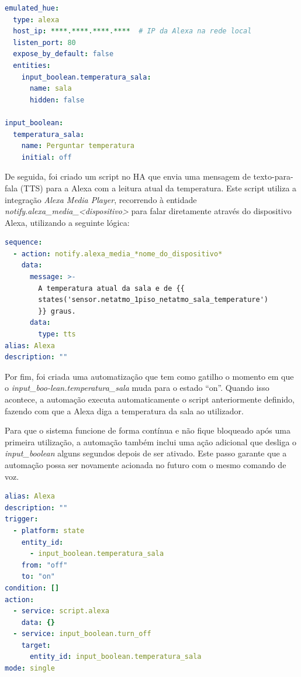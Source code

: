 \newpage

\lstset{inputencoding=ascii}
\begin{lstlisting}[language=YAML, caption={configuration.yaml}]
emulated_hue:
  type: alexa
  host_ip: ****.****.****.****  # IP da Alexa na rede local
  listen_port: 80
  expose_by_default: false
  entities:
    input_boolean.temperatura_sala:
      name: sala
      hidden: false

input_boolean:
  temperatura_sala:
    name: Perguntar temperatura
    initial: off
\end{lstlisting}

De seguida, foi criado um script no \gls{HA} que envia uma mensagem de texto-para-fala (TTS) para a Alexa com a leitura atual da temperatura. Este script utiliza a integração \textit{Alexa Media Player}, recorrendo à entidade \textit{notify.alexa\_media\_<dispositivo>} para falar diretamente através do dispositivo Alexa, utilizando a seguinte lógica:

\lstset{inputencoding=ascii}
\begin{lstlisting}[language=YAML, caption={configuration.yaml}]
sequence:
  - action: notify.alexa_media_*nome_do_dispositivo*
    data:
      message: >-
        A temperatura atual da sala e de {{
        states('sensor.netatmo_1piso_netatmo_sala_temperature') 
        }} graus.
      data:
        type: tts
alias: Alexa
description: ""
\end{lstlisting}

\vspace{-180pt}

\newpage

Por fim, foi criada uma automatização que tem como gatilho o momento em que o \textit{input\_boo-lean.temperatura\_sala} muda para o estado “on”. Quando isso acontece, a automação executa automaticamente o script anteriormente definido, fazendo com que a Alexa diga a temperatura da sala ao utilizador.

Para que o sistema funcione de forma contínua e não fique bloqueado após uma primeira utilização, a automação também inclui uma ação adicional que desliga o \textit{input\_boolean} alguns segundos depois de ser ativado. Este passo garante que a automação possa ser novamente acionada no futuro com o mesmo comando de voz.

\lstset{inputencoding=ascii}
\begin{lstlisting}[language=YAML, caption={configuration.yaml}]
alias: Alexa
description: ""
trigger:
  - platform: state
    entity_id:
      - input_boolean.temperatura_sala
    from: "off"
    to: "on"
condition: []
action:
  - service: script.alexa
    data: {}
  - service: input_boolean.turn_off
    target:
      entity_id: input_boolean.temperatura_sala
mode: single

\end{lstlisting} 

